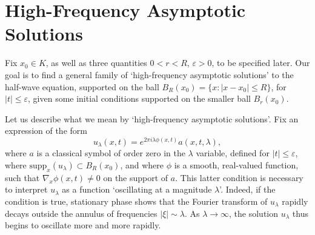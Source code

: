\documentclass{article}
\theoremstyle{plain}
\theoremstyle{remark}
\theoremstyle{definition}
\DeclareMathOperator{\RR}{\mathbb{R}}
\begin{document}


\section{High-Frequency Asymptotic Solutions}

Fix $x_0 \in K$, as well as three quantities $0 < r < R$, $\varepsilon > 0$, to be specified later. Our goal is to find a general family of `high-frequency asymptotic solutions' to the half-wave equation, supported on the ball $B_R(x_0) = \{ x: |x - x_0| \leq R \}$, for $|t| \leq \varepsilon$, given some initial conditions supported on the smaller ball $B_r(x_0)$.


Let us describe what we mean by `high-frequency asymptotic solutions'. Fix an expression of the form
%
\[ u_\lambda(x,t) = e^{2 \pi i \lambda \phi(x,t)} a(x,t,\lambda), \]
%
where $a$ is a classical symbol of order zero in the $\lambda$ variable, defined for $|t| \leq \varepsilon$, where $\text{supp}_x(u_\lambda) \subset B_R(x_0)$, and where $\phi$ is a smooth, real-valued function, such that $\nabla_x \phi(x,t) \neq 0$ on the support of $a$. This latter condition is necessary to interpret $u_\lambda$ as a function `oscillating at a magnitude $\lambda$'. Indeed, if the condition is true, stationary phase shows that the Fourier transform of $u_\lambda$ rapidly decays outside the annulus of frequencies $|\xi| \sim \lambda$. As $\lambda \to \infty$, the solution $u_\lambda$ thus begins to oscillate more and more rapidly.

%
\end{document}
